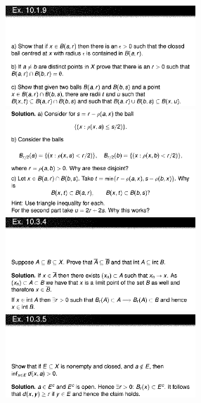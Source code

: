 \documentclass[8pt,landscape]{article}
\begin{document}
\begin{multicols}{3}
    \includegraphics[width=270]{Slides01.png} \\
    \includegraphics[width=270]{Slides02.png} \\
    \includegraphics[width=270]{Slides03.png} \\
    \includegraphics[width=270]{Slides04.png} \\

\end{multicols}
\end{document}

